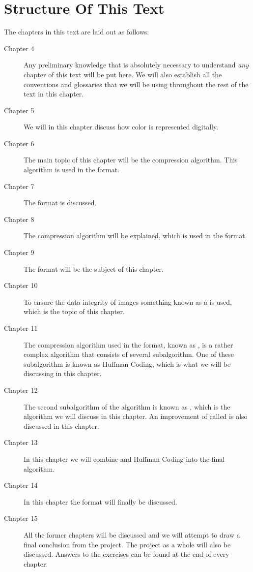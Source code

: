 \section{Structure Of This Text}

The chapters in this text are laid out as follows:

\begin{description}
\item[Chapter 4] Any preliminary knowledge that is absolutely
  necessary to understand \textit{any} chapter of this text will be
  put here. We will also establish all the conventions and glossaries
  that we will be using throughout the rest of the text in this
  chapter.

\item[Chapter 5] We will in this chapter discuss how color is
  represented digitally.

\item[Chapter 6] The main topic of this chapter will be the \rle
  compression algorithm. This algorithm is used in the \tga format.

\item[Chapter 7] The \tga format is discussed.

\item[Chapter 8] The \lzw compression algorithm will be explained,
  which is used in the \gif format.

\item[Chapter 9] The \gif format will be the subject of this chapter.

\item[Chapter 10] To ensure the data integrity of \png images something
  known as a \crc is used, which is the topic of this chapter.

\item[Chapter 11] The compression algorithm used in the \png format,
  known as , is a rather complex algorithm that consists of
  several subalgorithm. One of these subalgorithm is known as
  Huffman Coding, which is what we will be discussing in this chapter.

\item[Chapter 12] The second subalgorithm of the  algorithm is
  known as \lzone, which is the algorithm we will discuss in this
  chapter. An improvement of \lzone called \lzss is also discussed in
  this chapter.

\item[Chapter 13] In this chapter we will combine \lzone and Huffman
  Coding into the final  algorithm.

\item[Chapter 14] In this chapter the \png format will finally be
  discussed.

\item[Chapter 15] All the former chapters will be discussed and we
  will attempt to draw a final conclusion from the project. The
  project as a whole will also be discussed. Answers to the exercises
  can be found at the end of every chapter.

\end{description}

